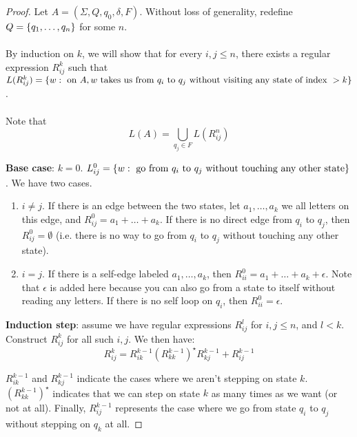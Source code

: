 \documentclass[]{article}
\DeclarePairedDelimiter{\set}{\lbrace}{\rbrace}
\theoremstyle{definition}
\begin{document}
        \begin{proof}
          Let $A = (\Sigma, Q, q_0, \delta, F)$. Without loss of generality, redefine $Q = \set{ q_1, \ldots, q_n }$ for some $n$.
          \\ \\
          By induction on $k$, we will show that for every $i, j \le n$, there exists a regular expression $R_{ij}^k$ such that $L(R_{ij}^k) = \set{ w : \text{ on } A, w \text{ takes us from } q_i \text{ to } q_j \text{ without visiting any state of index } > k}$.
          \\ \\
          Note that
          $$
            L(A) = \bigcup_{q_j \in F} L(R_{ij}^n)
          $$

          \textbf{Base case}: $k = 0$. $L_{ij}^0 = \set{ w : \text{ go from } q_i \text{ to } q_j \text{ without touching any other state}}$. We have two cases.

          \begin{enumerate}
            \item $i \ne j$. If there is an edge between the two states, let $a_1, \ldots, a_k$ we all letters on this edge, and $R_{ij}^0 = a_1 + \ldots + a_k$. If there is no direct edge from $q_i$ to $q_j$, then $R_{ij}^0 = \emptyset$ (i.e. there is no way to go from $q_i$ to $q_j$ without touching any other state).
            \item $i = j$. If there is a self-edge labeled $a_1, \ldots, a_k$, then $R_{ii}^0 = a_1 + \ldots + a_k + \epsilon$. Note that $\epsilon$ is added here because you can also go from a state to itself without reading any letters. If there is no self loop on $q_i$, then $R_{ii}^0 = \epsilon$.
          \end{enumerate}

          \textbf{Induction step}: assume we have regular expressions $R_{ij}^l$ for $i, j \le n$, and $l < k$. Construct $R_{ij}^k$ for all such $i, j$. We then have:
          $$
            R_{ij}^k = R_{ik}^{k - 1} (R_{kk}^{k - 1})^\star R_{kj}^{k - 1} + R_{ij}^{k - 1}
          $$

          $R_{ik}^{k - 1}$ and $R_{kj}^{k - 1}$ indicate the cases where we aren't stepping on state $k$. $(R_{kk}^{k - 1})^\star$ indicates that we can step on state $k$ as many times as we want (or not at all). Finally, $R_{ij}^{k - 1}$ represents the case where we go from state $q_i$ to $q_j$ without stepping on $q_k$ at all.
        \end{proof}
\end{document}
